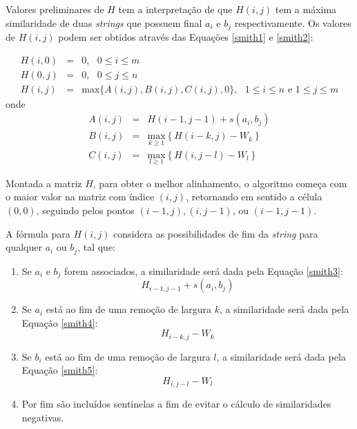 Valores preliminares de $H$ tem a interpretação de que $H(i,j)$ tem a máxima similaridade de duas \textit{strings} que possuem final $a_i$ e $b_j$ respectivamente. Os valores de $H(i,j)$ podem ser obtidos através das Equações \ref{smith1} e \ref{smith2}:

\begin{eqnarray*}\label{smith1}
	H(i,0) &=& 0, \, \, \, \, 0 \leq i \leq m \\
	H(0,j) &=& 0, \, \, \, \, 0 \leq j \leq n \\
	H(i,j) &=& \text{max}\lbrace A(i,j), B(i,j), C(i,j), 0\rbrace, \, \, \, \, 1 \leq i \leq n \text{ e } 1 \leq j \leq m
\end{eqnarray*}
onde
\begin{eqnarray*}\label{smith2}
		A(i, j) &=& H(i-1,j-1) + s(a_i,b_j) \\
		B(i, j) &=& \underset{k\geq1}{\text{max}} \left\{H(i-k,j) - W_k\right\}\\ 
		C(i, j) &=& \underset{l\geq1}{\text{max}} \left\{H(i,j-l) - W_l\right\}
\end{eqnarray*}

Montada a matriz $H$, para obter o melhor alinhamento, o algoritmo começa com o maior valor na matriz com índice $(i,j)$, retornando em sentido a célula $(0,0)$, seguindo pelos pontos $(i - 1,j), (i, j - 1)$, ou $(i - 1, j - 1)$.

A fórmula para $H(i,j)$ considera as possibilidades de fim da \textit{string} para qualquer $a_i$ ou $b_j$, tal que:

\begin{enumerate}
	\item Se $a_i$ e $b_j$ forem associados, a similaridade será dada pela Equação \ref{smith3}:
	\begin{equation}\label{smith3}
		H_{i-1,j-1} + s(a_i,b_j)
	\end{equation}
	\item Se $a_i$ está ao fim de uma remoção de largura $k$, a similaridade será dada pela Equação \ref{smith4}:
	\begin{equation}\label{smith4}
		H_{i-k,j} - W_k
	\end{equation}
	\item Se $b_i$ está ao fim de uma remoção de largura $l$, a similaridade será dada pela Equação \ref{smith5}:
	\begin{equation}\label{smith5}
		H_{i,j-l} - W_l
	\end{equation}
	\item Por fim são incluídos sentinelas a fim de evitar o cálculo de similaridades negativas.
\end{enumerate}


